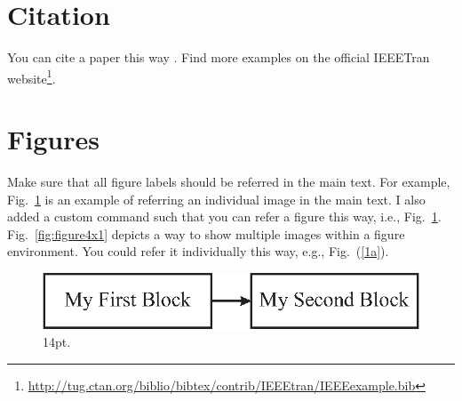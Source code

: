 \documentclass[conference, a4paper]{IEEEtran}
\newcommand\figref{Fig.~\ref}
\begin{document}
\section{Citation}
\label{sec:citation}

You can cite a paper this way \cite{lecun2015deep}. 
Find more examples on the official IEEETran website\footnote{\url{http://tug.ctan.org/biblio/bibtex/contrib/IEEEtran/IEEEexample.bib}}.  

\lipsum[1]


\section{Figures}
\label{sec:figures}

Make sure that all figure labels should be referred in the main text.
For example, Fig.~\ref{fig:figure1} is an example of referring an individual image in the main text.
I also added a custom command such that you can refer a figure this way, i.e., \figref{fig:figure1}.
Fig.~\ref{fig:figure4x1} depicts a way to show multiple images within a figure environment.
You could refer it individually this way, e.g., Fig.~(\ref{1a}).


    \begin{figure}[]
      \begin{center}{}
          \includegraphics[width=1\columnwidth,draft=false]{./figs/figure1.eps}
          \caption{14pt.}
          \label{fig:figure1}
      \end{center}
    \end{figure}
\end{document}
